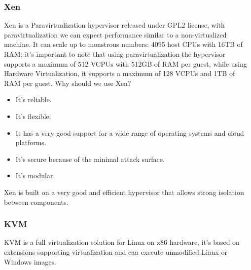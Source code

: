 \subsubsection{Xen}
Xen is a Paravirtualization hypervisor released under GPL2 license, with paravirtualization we can expect performance similar to a non-virtualized machine. It can scale up to monstrous numbers: 4095 host CPUs with 16TB of RAM; it's important to note that using paravirtualization the hypervisor supports a maximum of 512 VCPUs with 512GB of RAM per guest, while using Hardware Virtualization, it supports a maximum of 128 VCPUs and 1TB of RAM per guest. \n
Why should we use Xen?
\begin{itemize}
    \item It's reliable.
    \item It's flexible.
    \item It has a very good support for a wide range of operating systems and cloud platforms.
    \item It's secure because of the minimal attack surface.
    \item It's modular.
\end{itemize}
Xen is built on a very good and efficient hypervisor that allows strong isolation between components.
\subsubsection{KVM}
KVM is a full virtualization solution for Linux on x86 hardware, it's based on extensions supporting virtualization and can execute unmodified Linux or Windows images.
